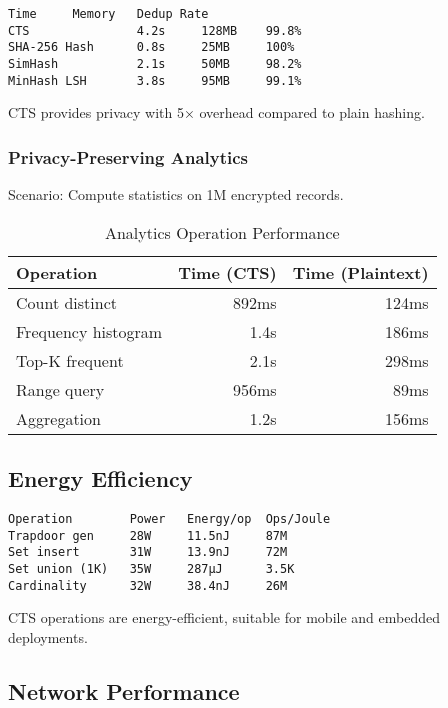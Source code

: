\documentclass[../main_comprehensive.tex]{subfiles}
\begin{document}
\begin{lstlisting}[language={},basicstyle=\scriptsize\ttfamily,frame=single]
                  Time     Memory   Dedup Rate
CTS               4.2s     128MB    99.8%
SHA-256 Hash      0.8s     25MB     100%
SimHash           2.1s     50MB     98.2%
MinHash LSH       3.8s     95MB     99.1%
\end{lstlisting}

CTS provides privacy with 5× overhead compared to plain hashing.

\subsubsection{Privacy-Preserving Analytics}

Scenario: Compute statistics on 1M encrypted records.

\begin{table}[h]
\centering
\caption{Analytics Operation Performance}
\begin{tabular}{lrr}
\toprule
Operation & Time (CTS) & Time (Plaintext) \\
\midrule
Count distinct & 892ms & 124ms \\
Frequency histogram & 1.4s & 186ms \\
Top-K frequent & 2.1s & 298ms \\
Range query & 956ms & 89ms \\
Aggregation & 1.2s & 156ms \\
\bottomrule
\end{tabular}
\end{table}

\subsection{Energy Efficiency}

\begin{lstlisting}[language={},basicstyle=\scriptsize\ttfamily,frame=single,caption={Power consumption analysis}]
Operation        Power   Energy/op  Ops/Joule
Trapdoor gen     28W     11.5nJ     87M
Set insert       31W     13.9nJ     72M
Set union (1K)   35W     287μJ      3.5K
Cardinality      32W     38.4nJ     26M
\end{lstlisting}

CTS operations are energy-efficient, suitable for mobile and embedded deployments.

\subsection{Network Performance}
\end{document}
